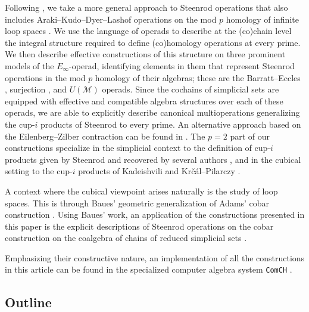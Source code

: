 Following \cite{may1970general}, we take a more general approach to Steenrod operations that also includes Araki--Kudo--Dyer--Lashof operations on the mod $p$ homology of infinite loop spaces \cite{araki56squaring, dyer62lashof}.
We use the language of operads \cite{may1972geometry} to describe at the (co)chain level the integral structure required to define (co)homology operations at every prime.
We then describe effective constructions of this structure on three prominent models of the $E_\infty$-operad, identifying elements in them that represent Steenrod operations in the mod $p$ homology of their algebras; these are the Barratt--Eccles \cite{berger2004combinatorial}, surjection \cite{mcclure2003multivariable}, and $U(\mathcal M)$ \cite{medina2020prop1} operads.
Since the cochains of simplicial sets are equipped with effective and compatible algebra structures over each of these operads, we are able to explicitly describe canonical multioperations generalizing the \mbox{cup-$i$} products of Steenrod to every prime.
An alternative approach based on the Eilenberg--Zilber contraction can be found in \cite{gonzalez2005cocyclic}.
The $p = 2$ part of our constructions specialize in the simplicial context to the definition of cup-$i$ products given by Steenrod \cite{steenrod1947products} and recovered by several authors \cite{mcclure2003multivariable, berger2004combinatorial, medina2021newformulas}, and in the cubical setting to the cup-$i$ products of Kadeishvili \cite{kadeishvili2003cupi} and Kr\v{c}\'{a}l--Pilarczy \cite{pilarczyk2016cubical}.

A context where the cubical viewpoint arises naturally is the study of loop spaces.
This is through Baues' geometric generalization of Adams' cobar construction \cite{adams1956cobar, baues1998hopf}.
Using Baues' work, an application of the constructions presented in this paper is the explicit descriptions of Steenrod operations on the cobar construction on the coalgebra of chains of reduced simplicial sets \cite{medina2021cobar}.

Emphasizing their constructive nature, an implementation of all the constructions in this article can be found in the specialized computer algebra system \texttt{ComCH} \cite{medina2021computer}.

\subsection{Outline}

